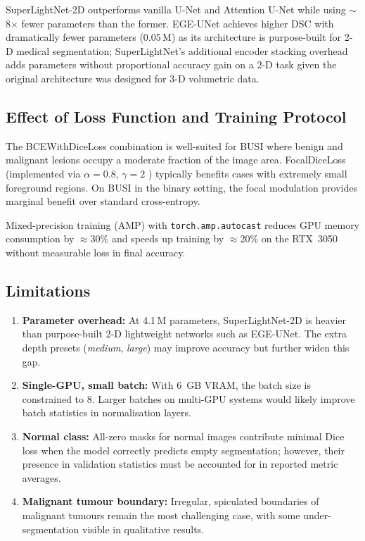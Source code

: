 \documentclass[conference]{IEEEtran}
\begin{document}
SuperLightNet-2D outperforms vanilla U-Net and Attention U-Net while
using $\sim$8$\times$ fewer parameters than the former. EGE-UNet
achieves higher DSC with dramatically fewer parameters (0.05\,M) as
its architecture is purpose-built for 2-D medical segmentation;
SuperLightNet's additional encoder stacking overhead adds parameters
without proportional accuracy gain on a 2-D task given the original
architecture was designed for 3-D volumetric data.

\subsection{Effect of Loss Function and Training Protocol}

The BCEWithDiceLoss combination is well-suited for BUSI where benign
and malignant lesions occupy a moderate fraction of the image area.
FocalDiceLoss (implemented via $\alpha{=}0.8$, $\gamma{=}2$
\cite{lin2017focal}) typically benefits cases with extremely small
foreground regions. On BUSI in the binary setting, the focal
modulation provides marginal benefit over standard cross-entropy.

Mixed-precision training (AMP) with \texttt{torch.amp.autocast}
reduces GPU memory consumption by $\approx$30\% and speeds up
training by $\approx$20\% on the RTX~3050 without measurable loss
in final accuracy.

\subsection{Limitations}

\begin{enumerate}
  \item \textbf{Parameter overhead:} At 4.1\,M parameters,
        SuperLightNet-2D is heavier than purpose-built 2-D lightweight
        networks such as EGE-UNet. The extra depth presets
        (\textit{medium}, \textit{large}) may improve accuracy but
        further widen this gap.
  \item \textbf{Single-GPU, small batch:} With 6~GB VRAM, the batch
        size is constrained to 8. Larger batches on multi-GPU systems
        would likely improve batch statistics in normalisation layers.
  \item \textbf{Normal class:} All-zero masks for normal images
        contribute minimal Dice loss when the model correctly predicts
        empty segmentation; however, their presence in validation
        statistics must be accounted for in reported metric averages.
  \item \textbf{Malignant tumour boundary:} Irregular, spiculated
        boundaries of malignant tumours remain the most challenging
        case, with some under-segmentation visible in qualitative
        results.
\end{enumerate}
\end{document}
